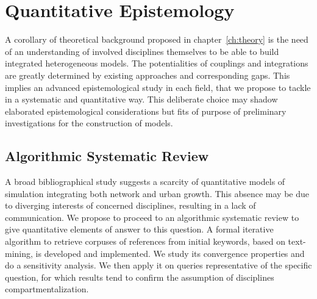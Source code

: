 





\chapter{Quantitative Epistemology} %

\label{ch:quantepistemo} %





A corollary of theoretical background proposed in chapter~\ref{ch:theory} is the need of an understanding of involved disciplines themselves to be able to build integrated heterogeneous models. The potentialities of couplings and integrations are greatly determined by existing approaches and corresponding gaps. This implies an advanced epistemological study in each field, that we propose to tackle in a systematic and quantitative way. This deliberate choice may shadow elaborated epistemological considerations but fits of purpose of preliminary investigations for the construction of models. 








\newpage


\section{Algorithmic Systematic Review}


A broad bibliographical study suggests a scarcity of quantitative models of simulation integrating both network and urban growth. This absence may be due to diverging interests of concerned disciplines, resulting in a lack of communication.  We propose to proceed to an algorithmic systematic review to give quantitative elements of answer to this question. A formal iterative algorithm to retrieve corpuses of references from initial keywords, based on text-mining, is developed and implemented. We study its convergence properties and do a sensitivity analysis. We then apply it on queries representative of the specific question, for which results tend to confirm the assumption of disciplines compartmentalization.



